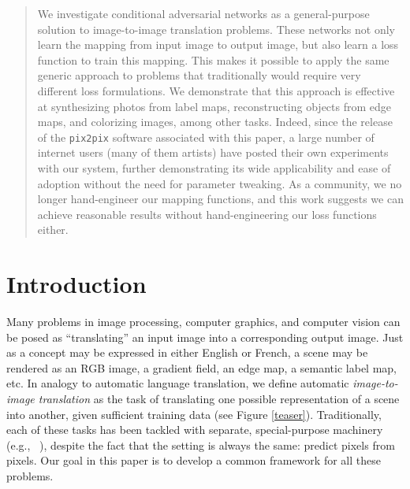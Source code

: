 \documentclass[10pt,twocolumn,letterpaper]{article}
\begin{document}
\vspace{-1mm}
\begin{abstract}
\vspace{-1mm}
We investigate conditional adversarial networks as a general-purpose solution to image-to-image translation problems. These networks not only learn the mapping from input image to output image, but also learn a loss function to train this mapping. This makes it possible to apply the same generic approach to problems that traditionally would require very different loss formulations. We demonstrate that this approach is effective at synthesizing photos from label maps, reconstructing objects from edge maps, and colorizing images, among other tasks. Indeed, since the release of the {\tt pix2pix} software associated with this paper, a large number of internet users (many of them artists) have posted their own experiments with our system, further demonstrating its wide applicability and ease of adoption without the need for parameter tweaking.
As a community, we no longer hand-engineer our mapping functions, and this work suggests we can achieve reasonable results without hand-engineering our loss functions either.

\end{abstract}


\vspace{-1mm}
\section{Introduction}
\vspace{-1mm}
Many problems in image processing, computer graphics, and computer vision can be posed as ``translating'' an input image into a corresponding output image. Just as a concept may be expressed in either English or French, a scene may be rendered as an RGB image, a gradient field, an edge map, a semantic label map, etc. In analogy to automatic language translation, we define automatic \emph{image-to-image translation} as the task of translating one possible representation of a scene into another, given sufficient training data (see Figure \ref{teaser}).
Traditionally, each of these tasks has been tackled with separate, special-purpose machinery (e.g., ~\cite{efros2001image, hertzmann2001image, fergus2006removing, buades2005non, chen2009sketch2photo, shih2013data, laffont2014transient, long2015fully, eigen2015predicting, xie2015holistically, zhang2016colorful}), despite the fact that the setting is always the same: predict pixels from pixels. Our goal in this paper is to develop a common framework for all these problems.
\end{document}
